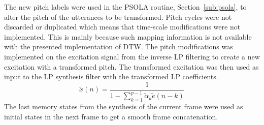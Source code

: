 The new pitch labels were used in the PSOLA routine, Section~\ref{sub:psola}, to alter the pitch of the utterances to be transformed. Pitch cycles were not discarded or duplicated which means that time-scale modifications were not implemented. This is mainly because such mapping information is not available with the presented implementation of DTW. The pitch modifications was implemented on the excitation signal from the inverse LP filtering to create a new excitation with a transformed pitch. The transformed excitation was then used as input to the LP synthesis filter with the transformed LP coefficients. 
\begin{equation}
	\tilde{x}(n) = \frac{1}{1 - \sum_{k=1}^{p-1} \tilde{\alpha}_k \tilde{e}(n-k)}
\end{equation}
The last memory states from the synthesis of the current frame were used as initial states in the next frame to get a smooth frame concatenation.



